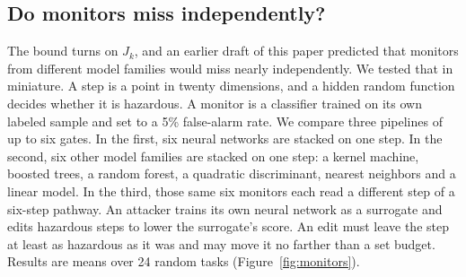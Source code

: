 \documentclass[10pt,twocolumn,letterpaper]{article}
\theoremstyle{definition}
\newcommand{\MonTasks}{24}
\begin{document}
\subsection{Do monitors miss independently?}
\label{sec:expmonitors}

The bound turns on $J_{k}$, and an earlier draft of this paper predicted that monitors from different model families would miss nearly independently. We tested that in miniature. A step is a point in twenty dimensions, and a hidden random function decides whether it is hazardous. A monitor is a classifier trained on its own labeled sample and set to a 5\% false-alarm rate. We compare three pipelines of up to six gates. In the first, six neural networks are stacked on one step. In the second, six other model families are stacked on one step: a kernel machine, boosted trees, a random forest, a quadratic discriminant, nearest neighbors and a linear model. In the third, those same six monitors each read a different step of a six-step pathway. An attacker trains its own neural network as a surrogate and edits hazardous steps to lower the surrogate's score. An edit must leave the step at least as hazardous as it was and may move it no farther than a set budget. Results are means over \MonTasks{} random tasks (Figure~\ref{fig:monitors}).
\end{document}
